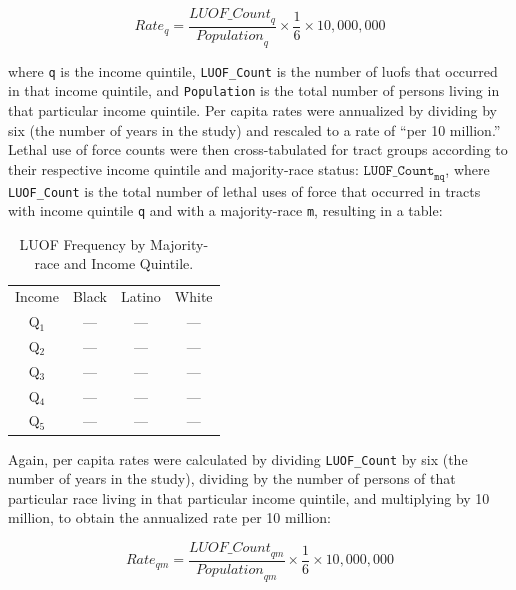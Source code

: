 \documentclass[12pt]{article}
\begin{document}
\begin{equation}
{Rate}_q=\frac{{LUOF\_Count}_q}{{Population}_q}\times\frac{1}{6}\times10,000,000
\label{eq:quintile_rate}
\end{equation}

\noindent{}where \texttt{q} is the income quintile, \texttt{LUOF\_Count} is the number of \acrshort{luof}s that occurred in that income quintile, and \texttt{Population} is the total number of persons living in that particular income quintile. Per capita rates were annualized by dividing by six (the number of years in the study) and rescaled to a rate of “per 10 million.” Lethal use of force counts were then cross-tabulated for tract groups according to their respective income quintile and majority-race status: $\texttt{LUOF\_Count}_\texttt{mq}$, where \texttt{LUOF\_Count} is the total number of lethal uses of force that occurred in tracts with income quintile \texttt{q} and with a majority-race \texttt{m}, resulting in a table:

\begin{table}[h]
\centering
\begin{tabular}{cccc} %
Income&Black&Latino&White\\
Q$_1$ &---&---&---\\
Q$_2$ &---&---&---\\
Q$_3$ &---&---&---\\
Q$_4$ &---&---&---\\
Q$_5$ &---&---&---\\
\end{tabular}
  \captionsetup{justification=centering, singlelinecheck=false, margin=2cm}
  \caption[LUOF Frequency: Majority-race and Income Quintile]{LUOF Frequency by Majority-race and Income Quintile.}
  \label{tab:luof_freq_majority_quintile}
\end{table}

Again, per capita rates were calculated by dividing \texttt{LUOF\_Count} by six (the number of years in the study), dividing by the number of persons of that particular race living in that particular income quintile, and multiplying by 10 million, to obtain the annualized rate per 10 million:

\begin{equation}
{Rate}_{qm}=\frac{{LUOF\_Count}_{qm}}{{Population}_{qm}}\times\frac{1}{6}\times10,000,000
\label{eq:quintile_majority_rate}
\end{equation}
\end{document}

